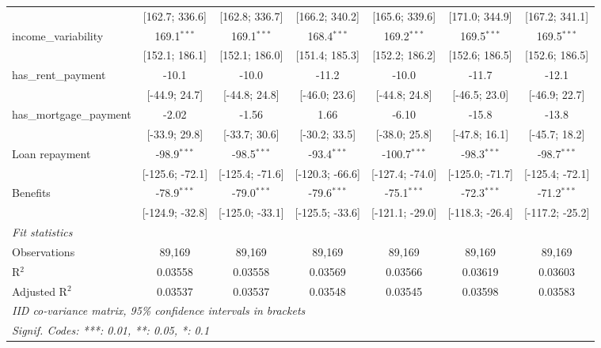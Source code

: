 \begin{table}[htbp]
\begin{threeparttable}[b]
\begin{tabular}{lcccccc}
                                   & [162.7; 336.6]   & [162.8; 336.7]   & [166.2; 340.2]   & [165.6; 339.6]   & [171.0; 344.9]   & [167.2; 341.1]\\   
         income\_variability       & 169.1$^{***}$    & 169.1$^{***}$    & 168.4$^{***}$    & 169.2$^{***}$    & 169.5$^{***}$    & 169.5$^{***}$\\   
                                   & [152.1; 186.1]   & [152.1; 186.0]   & [151.4; 185.3]   & [152.2; 186.2]   & [152.6; 186.5]   & [152.6; 186.5]\\   
         has\_rent\_payment        & -10.1            & -10.0            & -11.2            & -10.0            & -11.7            & -12.1\\   
                                   & [-44.9; 24.7]    & [-44.8; 24.8]    & [-46.0; 23.6]    & [-44.8; 24.8]    & [-46.5; 23.0]    & [-46.9; 22.7]\\   
         has\_mortgage\_payment    & -2.02            & -1.56            & 1.66             & -6.10            & -15.8            & -13.8\\   
                                   & [-33.9; 29.8]    & [-33.7; 30.6]    & [-30.2; 33.5]    & [-38.0; 25.8]    & [-47.8; 16.1]    & [-45.7; 18.2]\\   
         Loan repayment            & -98.9$^{***}$    & -98.5$^{***}$    & -93.4$^{***}$    & -100.7$^{***}$   & -98.3$^{***}$    & -98.7$^{***}$\\   
                                   & [-125.6; -72.1]  & [-125.4; -71.6]  & [-120.3; -66.6]  & [-127.4; -74.0]  & [-125.0; -71.7]  & [-125.4; -72.1]\\   
         Benefits                  & -78.9$^{***}$    & -79.0$^{***}$    & -79.6$^{***}$    & -75.1$^{***}$    & -72.3$^{***}$    & -71.2$^{***}$\\   
                                   & [-124.9; -32.8]  & [-125.0; -33.1]  & [-125.5; -33.6]  & [-121.1; -29.0]  & [-118.3; -26.4]  & [-117.2; -25.2]\\   
         \midrule
         \emph{Fit statistics}\\
         Observations              & 89,169           & 89,169           & 89,169           & 89,169           & 89,169           & 89,169\\  
         R$^2$                     & 0.03558          & 0.03558          & 0.03569          & 0.03566          & 0.03619          & 0.03603\\  
         Adjusted R$^2$            & 0.03537          & 0.03537          & 0.03548          & 0.03545          & 0.03598          & 0.03583\\  
         \midrule \midrule
         \multicolumn{7}{l}{\emph{IID co-variance matrix, 95\% confidence intervals in brackets}}\\
         \multicolumn{7}{l}{\emph{Signif. Codes: ***: 0.01, **: 0.05, *: 0.1}}\\
      \end{tabular}
      

\end{threeparttable}
\end{table}
